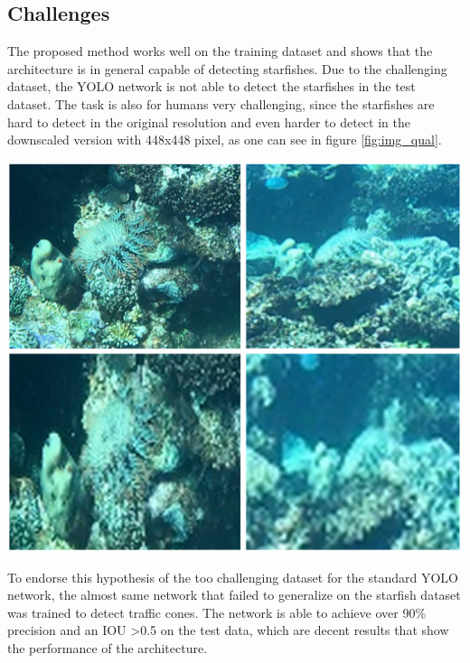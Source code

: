 \documentclass[landscape,a2,final,12pt]{issposter}
\begin{document}
\begin{multicols}{3}
\begin{samepage}
    \section{Challenges}
        \begin{small}The proposed method works well on the training dataset and shows that the architecture is in general 
            capable of detecting starfishes. Due to the challenging dataset, the YOLO network is not able to detect the 
            starfishes in the test dataset. 
            The task is also for humans very challenging, since the starfishes are hard to detect in the original resolution 
            and even harder to detect in the downscaled version with 448x448 pixel, as one can see in figure \ref{fig:img_qual}. 
            \begin{center}
                \includegraphics[scale=0.2]{6_img_quality.png}
                \label{fig:img_qual}
            \end{center}
            To endorse this hypothesis of the too challenging dataset for the standard YOLO network, the almost same network that 
            failed to generalize on the starfish dataset was trained to detect traffic cones. The network is able to achieve 
            over 90\% precision and an IOU \textgreater 0.5 on the test data, which are
            decent results that show the performance of the architecture. 
        \end{small}
    \end{samepage}
\end{multicols}
\end{document}
